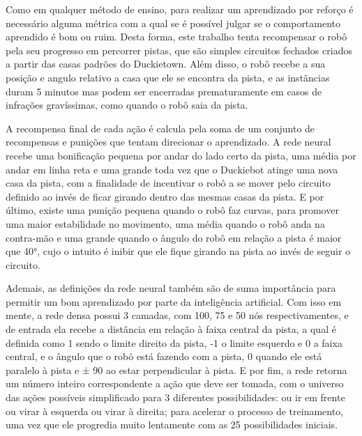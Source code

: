 Como em qualquer método de ensino, para realizar um aprendizado por reforço é necessário alguma métrica com a qual se é possível julgar se o comportamento aprendido é bom ou ruim. Desta forma, este trabalho tenta recompensar o robô pela seu progresso em percorrer pistas, que são simples circuitos fechados criados a partir das casas padrões do Duckietown. Além disso, o robô recebe a sua posição e angulo relativo a casa que ele se encontra da pista, e as instâncias duram 5 minutos mas podem ser encerradas prematuramente em casos de infrações gravíssimas, como quando o robô saia da pista.

A recompensa final de cada ação é calcula pela soma de um conjunto de recompensas e punições que tentam direcionar o aprendizado. A rede neural recebe uma bonificação pequena por andar do lado certo da pista, uma média por andar em linha reta e uma grande toda vez que o Duckiebot atinge uma nova casa da pista, com a finalidade de incentivar o robô a se mover pelo circuito definido ao invés de ficar girando dentro das mesmas casas da pista. E por último, existe uma punição pequena quando o robô faz curvas, para promover uma maior estabilidade no movimento, uma média quando o robô anda na contra-mão e uma grande quando o ângulo do robô em relação a pista é maior que 40°, cujo o intuito é inibir que ele fique girando na pista ao invés de seguir o circuito.
	
Ademais, as definições da rede neural também são de suma importância para permitir um bom aprendizado por parte da inteligência artificial. Com isso em mente, a rede densa possui 3 camadas, com 100, 75 e 50 nós respectivamentes, e de entrada ela recebe a distância em relação à faixa central da pista, a qual é definida como 1 sendo o limite direito da pista, -1 o limite esquerdo e 0 a faixa central, e o ângulo que o robô está fazendo com a pista, 0 quando ele está paralelo à pista e ± 90 ao estar perpendicular à pista. E por fim, a rede retorna um número inteiro correspondente a ação que deve ser tomada, com o universo das ações possíveis simplificado para 3 diferentes possibilidades: ou ir em frente ou virar à esquerda ou virar à direita; para acelerar o processo de treinamento, uma vez que ele progredia muito lentamente com as 25 possibilidades iniciais.
